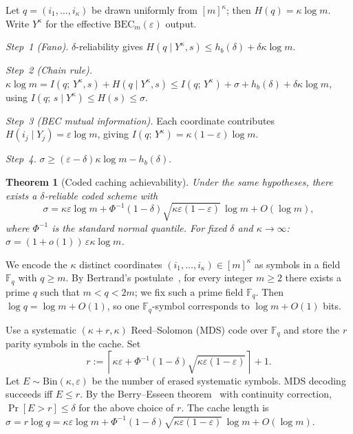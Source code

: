 \documentclass[journal]{IEEEtran}
\makeatletter
\newtheorem{theorem}{Theorem}[section]
\numberwithin{equation}{section}
\renewenvironment{proof}[1][\proofname]{\par
  \pushQED{\qed}%
  \normalfont \topsep6\p@\@plus6\p@\relax
  \trivlist
  \item[\hskip\labelsep
        \itshape
    #1\@addpunct{.}]\ignorespaces
}{%
  \popQED\endtrivlist\@endpefalse
}
\makeatother
\begin{document}
\begin{proof}
Let $q=(i_1,\ldots,i_\kappa)$ be drawn uniformly from
$[m]^\kappa$; then $H(q)=\kappa\log m$.
Write $Y^\kappa$ for the effective
$\mathrm{BEC}_m(\varepsilon)$ output.

\emph{Step~1 (Fano).}
$\delta$-reliability gives
$H(q\mid Y^\kappa,s)
\le h_b(\delta)+\delta\kappa\log m$.

\emph{Step~2 (Chain rule).}
$\kappa\log m
=I(q;\,Y^\kappa,s)+H(q\mid Y^\kappa,s)
\le I(q;\,Y^\kappa)+\sigma
  +h_b(\delta)+\delta\kappa\log m$,
using $I(q;\,s\mid Y^\kappa)\le H(s)\le\sigma$.

\emph{Step~3 (BEC mutual information).}
Each coordinate contributes
$H(i_j\mid Y_j)=\varepsilon\log m$, giving
$I(q;\,Y^\kappa)=\kappa(1{-}\varepsilon)\log m$.

\emph{Step~4.}
$\sigma
\ge(\varepsilon{-}\delta)\kappa\log m-h_b(\delta)$.
\end{proof}

\begin{theorem}[Coded caching achievability]
\label{thm:coded-achievability}
Under the same hypotheses, there exists a $\delta$-reliable
coded scheme with
\begin{equation}\label{eq:coded-achievability}
  \sigma
  =\kappa\varepsilon\log m
  +\Phi^{-1}(1{-}\delta)
    \sqrt{\kappa\varepsilon(1{-}\varepsilon)}\,\log m
  +O(\log m),
\end{equation}
where $\Phi^{-1}$ is the standard normal quantile.
For fixed $\delta$ and $\kappa\to\infty$:
$\sigma=(1{+}o(1))\,\varepsilon\kappa\log m$.
\end{theorem}

\begin{proof}
We encode the \(\kappa\) distinct coordinates \((i_1,\ldots,i_\kappa)\in[m]^\kappa\)
as symbols in a field \(\mathbb F_q\) with \(q\ge m\).
By Bertrand's postulate~\cite{aigner1999proofs}, for every integer \(m\ge 2\) there exists a prime
\(q\) such that \(m<q<2m\); we fix such a prime field \(\mathbb F_q\).
Then \(\log q=\log m+O(1)\), so one \(\mathbb F_q\)-symbol corresponds to
\(\log m+O(1)\) bits.

Use a systematic \((\kappa+r,\kappa)\) Reed--Solomon (MDS) code over \(\mathbb F_q\)
and store the \(r\) parity symbols in the cache. Set
\[
  r:=\left\lceil \kappa\varepsilon
  +\Phi^{-1}(1-\delta)\sqrt{\kappa\varepsilon(1-\varepsilon)}\right\rceil + 1.
\]
Let \(E\sim\mathrm{Bin}(\kappa,\varepsilon)\) be the number of erased systematic symbols.
MDS decoding succeeds iff \(E\le r\). By the Berry--Esseen theorem~\cite{feller1991introduction} with continuity
correction, \(\Pr[E>r]\le \delta\) for the above choice of \(r\).
The cache length is \(\sigma=r\log q=\kappa\varepsilon\log m
+\Phi^{-1}(1-\delta)\sqrt{\kappa\varepsilon(1-\varepsilon)}\,\log m+O(\log m)\).
\end{proof}
\end{document}
